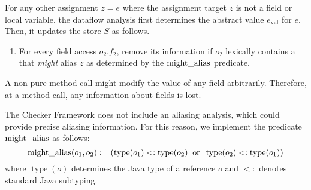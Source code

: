 For any other assignment $z = e$ where the
assignment target $z$ is not a field or local variable,
the dataflow analysis first determines the abstract value $e_\text{val}$ for
$e$.
Then, it updates the store $S$ as follows.
\begin{enumerate}
    \item For every field access $o_2.f_2$, remove its information if
    $o_2$ lexically contains a  that \emph{might}
    alias $z$ as determined by the $\operatorname{might\_alias}$ predicate.
\end{enumerate}



A non-pure method call might modify the value of any field arbitrarily.
Therefore, at a method call, any information about fields is lost.


\label{sec:alias}

The Checker Framework does not include an aliasing analysis, which could
provide precise aliasing information.  For this reason, we implement the
predicate $\operatorname{might\_alias}$ as follows:
\[ \operatorname{might\_alias}(o_1,o_2) :=
\left(\operatorname{type}(o_1) <: \operatorname{type}(o_2)
\;\;\text{or}\;\;
\operatorname{type}(o_2) <: \operatorname{type}(o_1) \right) \]
where $\operatorname{type}(o)$ determines the Java type of a reference $o$
and $<:$ denotes standard Java subtyping.



